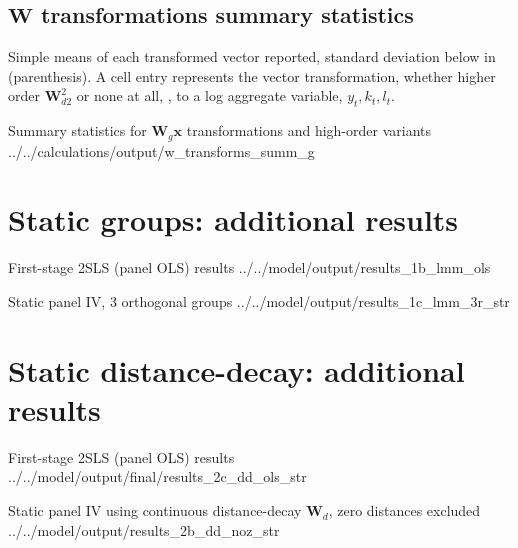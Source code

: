 \newpage
\subsection{$\mathbf W$ transformations summary statistics}
\label{app:data-w-transformations}

\begin{table}[hb!]
    \centering
    \begin{threeparttable}
        \caption{Summary statistics for $\mathbf W_d\mathbf x$ and high-order transformations}
        
        \begin{tablenotes}
            Simple means of each transformed vector reported,
            standard deviation below in (parenthesis).
            A cell entry represents the vector transformation, whether
            higher order $\mathbf W_{d2}^2$ or none at all, ,
            to a log aggregate variable, $y_{t}, k_t, l_t$.
        \end{tablenotes}
    \end{threeparttable}
\end{table}
\wraptable
    {Summary statistics for $\mathbf W_g\mathbf x$ transformations and high-order variants}
    {../../calculations/output/w_transforms_summ_g}
    {}

\newpage
\section{Static groups: additional results}
\label{app:static-groups}

\wraptable
    {First-stage 2SLS (panel OLS) results}
    {../../model/output/results_1b_lmm_ols}
    {}

\wraptable
    {Static panel IV, 3 orthogonal groups}
    {../../model/output/results_1c_lmm_3r_str}
    {}

\newpage
\section{Static distance-decay: additional results}
\label{app:static-dd}

\wraptable
    {First-stage 2SLS (panel OLS) results}
    {../../model/output/final/results_2c_dd_ols_str}
    {}

\wraptable
    {Static panel IV using continuous distance-decay $\mathbf W_d$, zero distances excluded}
    {../../model/output/results_2b_dd_noz_str}
    {}


